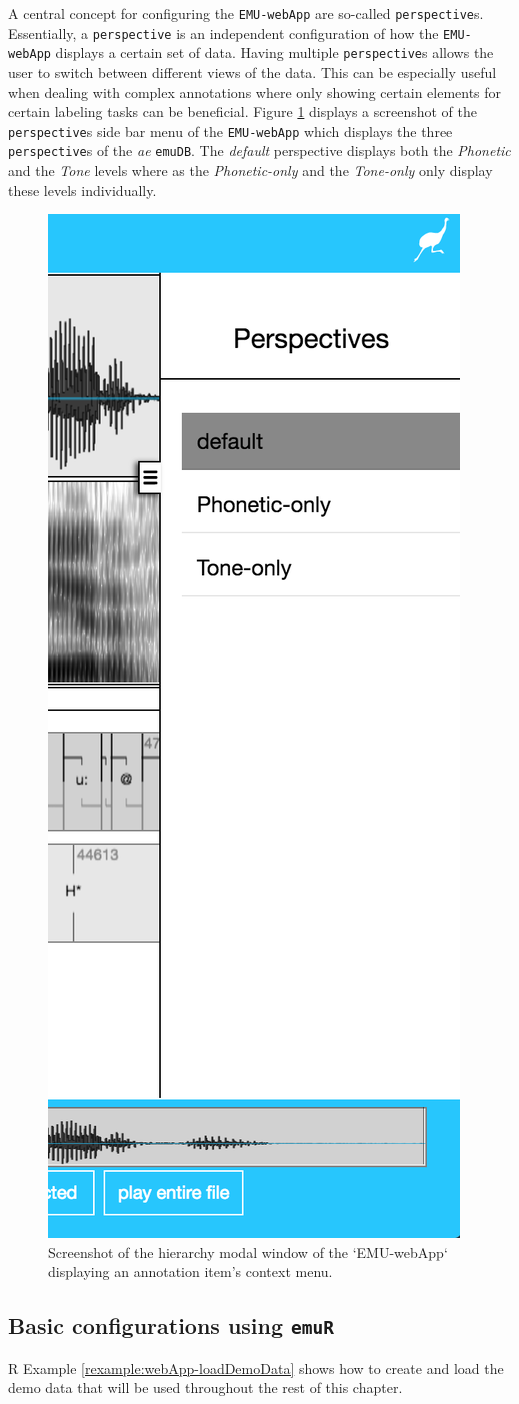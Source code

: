 \documentclass[]{book}
\theoremstyle{definition}
\theoremstyle{definition}
\theoremstyle{definition}
\theoremstyle{remark}
\begin{document}
A central concept for configuring the \texttt{EMU-webApp} are so-called
\texttt{perspective}s. Essentially, a \texttt{perspective} is an
independent configuration of how the \texttt{EMU-webApp} displays a
certain set of data. Having multiple \texttt{perspective}s allows the
user to switch between different views of the data. This can be
especially useful when dealing with complex annotations where only
showing certain elements for certain labeling tasks can be beneficial.
Figure \ref{fig:webApp-perspMenu} displays a screenshot of the
\texttt{perspective}s side bar menu of the \texttt{EMU-webApp} which
displays the three \texttt{perspective}s of the \emph{ae}
\texttt{emuDB}. The \emph{default} perspective displays both the
\emph{Phonetic} and the \emph{Tone} levels where as the
\emph{Phonetic-only} and the \emph{Tone-only} only display these levels
individually.

\begin{figure}

{\centering \includegraphics[width=0.25\linewidth]{pics/emu-webAppPerspMenu} 

}

\caption{Screenshot of the hierarchy modal window of the `EMU-webApp` displaying an annotation item's context menu.}\label{fig:webApp-perspMenu}
\end{figure}

\hypertarget{subsec:emu-webAppConfigWithEmuR}{%
\subsection{\texorpdfstring{Basic configurations using
\texttt{emuR}}{Basic configurations using emuR}}\label{subsec:emu-webAppConfigWithEmuR}}

R Example \ref{rexample:webApp-loadDemoData} shows how to create and
load the demo data that will be used throughout the rest of this
chapter.
\end{document}
